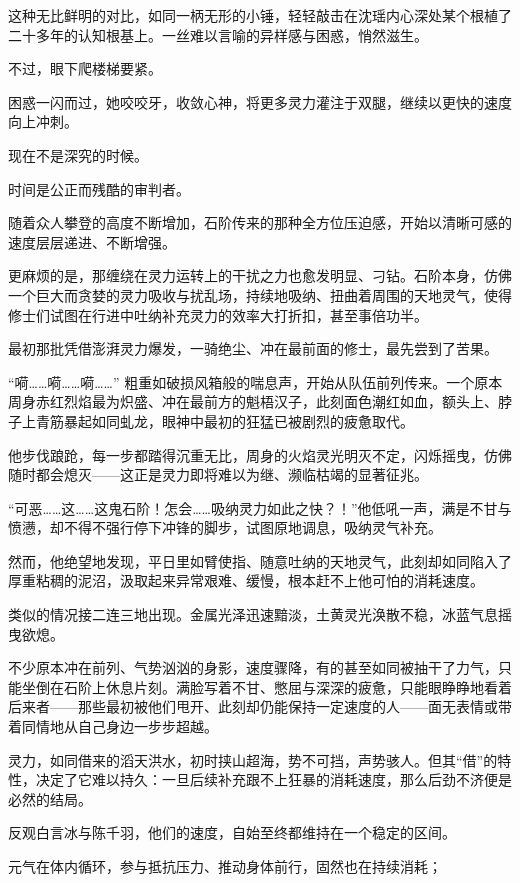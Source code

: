 这种无比鲜明的对比，如同一柄无形的小锤，轻轻敲击在沈瑶内心深处某个根植了二十多年的认知根基上。一丝难以言喻的异样感与困惑，悄然滋生。

不过，眼下爬楼梯要紧。

困惑一闪而过，她咬咬牙，收敛心神，将更多灵力灌注于双腿，继续以更快的速度向上冲刺。

现在不是深究的时候。

\vspace{2em}

时间是公正而残酷的审判者。

随着众人攀登的高度不断增加，石阶传来的那种全方位压迫感，开始以清晰可感的速度层层递进、不断增强。

更麻烦的是，那缠绕在灵力运转上的干扰之力也愈发明显、刁钻。石阶本身，仿佛一个巨大而贪婪的灵力吸收与扰乱场，持续地吸纳、扭曲着周围的天地灵气，使得修士们试图在行进中吐纳补充灵力的效率大打折扣，甚至事倍功半。

最初那批凭借澎湃灵力爆发，一骑绝尘、冲在最前面的修士，最先尝到了苦果。

“嗬……嗬……嗬……” 粗重如破损风箱般的喘息声，开始从队伍前列传来。一个原本周身赤红烈焰最为炽盛、冲在最前方的魁梧汉子，此刻面色潮红如血，额头上、脖子上青筋暴起如同虬龙，眼神中最初的狂猛已被剧烈的疲惫取代。

他步伐踉跄，每一步都踏得沉重无比，周身的火焰灵光明灭不定，闪烁摇曳，仿佛随时都会熄灭——这正是灵力即将难以为继、濒临枯竭的显著征兆。

“可恶……这……这鬼石阶！怎会……吸纳灵力如此之快？！”他低吼一声，满是不甘与愤懑，却不得不强行停下冲锋的脚步，试图原地调息，吸纳灵气补充。

然而，他绝望地发现，平日里如臂使指、随意吐纳的天地灵气，此刻却如同陷入了厚重粘稠的泥沼，汲取起来异常艰难、缓慢，根本赶不上他可怕的消耗速度。

类似的情况接二连三地出现。金属光泽迅速黯淡，土黄灵光涣散不稳，冰蓝气息摇曳欲熄。

不少原本冲在前列、气势汹汹的身影，速度骤降，有的甚至如同被抽干了力气，只能坐倒在石阶上休息片刻。满脸写着不甘、憋屈与深深的疲惫，只能眼睁睁地看着后来者——那些最初被他们甩开、此刻却仍能保持一定速度的人——面无表情或带着同情地从自己身边一步步超越。

灵力，如同借来的滔天洪水，初时挟山超海，势不可挡，声势骇人。但其“借”的特性，决定了它难以持久：一旦后续补充跟不上狂暴的消耗速度，那么后劲不济便是必然的结局。

反观白言冰与陈千羽，他们的速度，自始至终都维持在一个稳定的区间。

元气在体内循环，参与抵抗压力、推动身体前行，固然也在持续消耗；

